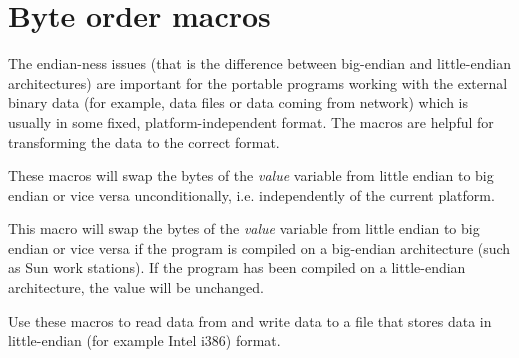 \section{Byte order macros}\label{byteordermacros}

The endian-ness issues (that is the difference between big-endian and
little-endian architectures) are important for the portable programs working
with the external binary data (for example, data files or data coming from
network) which is usually in some fixed, platform-independent format. The
macros are helpful for transforming the data to the correct format.


\label{intswapalways}





These macros will swap the bytes of the {\it value} variable from little
endian to big endian or vice versa unconditionally, i.e. independently of the
current platform.


\label{intswaponbe}





This macro will swap the bytes of the {\it value} variable from little
endian to big endian or vice versa if the program is compiled on a
big-endian architecture (such as Sun work stations). If the program has
been compiled on a little-endian architecture, the value will be unchanged.

Use these macros to read data from and write data to a file that stores
data in little-endian (for example Intel i386) format.


\label{intswaponle}


